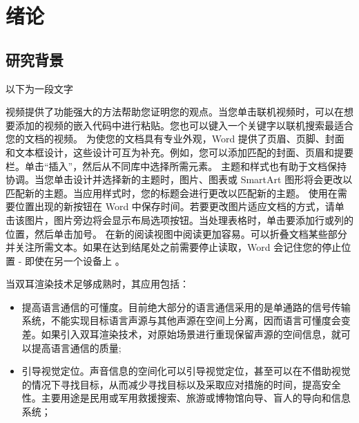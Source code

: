 \chapter{绪论}

\section{研究背景}

以下为一段文字

视频提供了功能强大的方法帮助您证明您的观点。当您单击联机视频时，可以在想要添加的视频的嵌入代码中进行粘贴。您也可以键入一个关键字以联机搜索最适合您的文档的视频。
为使您的文档具有专业外观，Word 提供了页眉、页脚、封面和文本框设计，这些设计可互为补充。例如，您可以添加匹配的封面、页眉和提要栏。单击“插入”，然后从不同库中选择所需元素。
主题和样式也有助于文档保持协调。当您单击设计并选择新的主题时，图片、图表或 SmartArt 图形将会更改以匹配新的主题。当应用样式时，您的标题会进行更改以匹配新的主题。
使用在需要位置出现的新按钮在 Word 中保存时间。若要更改图片适应文档的方式，请单击该图片，图片旁边将会显示布局选项按钮。当处理表格时，单击要添加行或列的位置，然后单击加号。
在新的阅读视图中阅读更加容易。可以折叠文档某些部分并关注所需文本。如果在达到结尾处之前需要停止读取，Word 会记住您的停止位置 - 即使在另一个设备上
\cite{geim_van_2013}。

当双耳渲染技术足够成熟时，其应用包括：
\begin{itemize}[leftmargin=*]
\item 提高语言通信的可懂度。目前绝大部分的语言通信采用的是单通路的信号传输系统，不能实现目标语言声源与其他声源在空间上分离，因而语言可懂度会变差。如果引入双耳渲染技术，对原始场景进行重现保留声源的空间信息，就可以提高语言通信的质量;\cite{_fe-p_2020}
\item 引导视觉定位。声音信息的空间化可以引导视觉定位，甚至可以在不借助视觉的情况下寻找目标，从而减少寻找目标以及采取应对措施的时间，提高安全性。主要用途是民用或军用救援搜索、旅游或博物馆向导、盲人的导向和信息系统；\cite{lei_atomically_2015}

\end{itemize}


